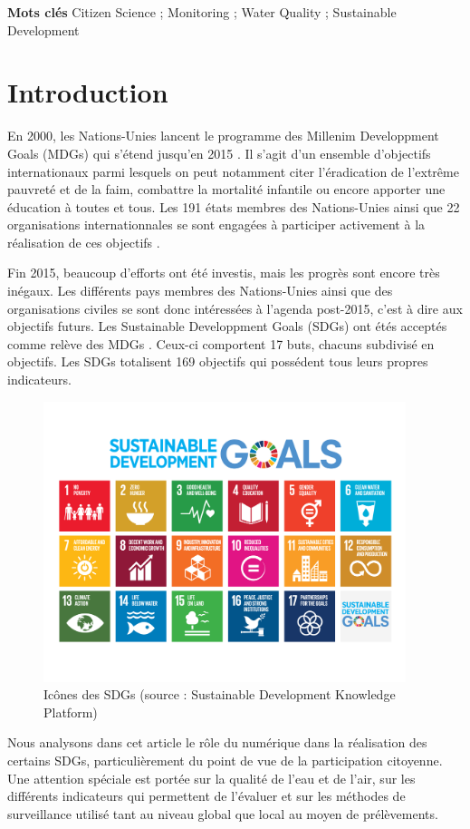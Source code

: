 \documentclass[10pt, article]{llncs}
\begin{document}
\textbf{Mots clés} Citizen Science ; Monitoring ; Water Quality ; Sustainable Development

\pagebreak

\section{Introduction}
	En 2000, les Nations-Unies lancent le programme des Millenim Developpment Goals (MDGs) qui s'étend jusqu'en 2015 \cite{united_nations_millennium_2009}. Il s'agit d'un ensemble d'objectifs internationaux parmi lesquels on peut notamment citer l'éradication de l'extrême pauvreté et de la faim, combattre la mortalité infantile ou encore apporter une éducation à toutes et tous. Les 191 états membres des Nations-Unies ainsi que 22 organisations internationnales se sont engagées à participer activement à la réalisation de ces objectifs \cite{wikipedia_millennium_2017}.
	
	Fin 2015, beaucoup d'efforts ont été investis, mais les progrès sont encore très inégaux. Les différents pays membres des Nations-Unies ainsi que des organisations civiles se sont donc intéressées à l'agenda post-2015, c'est à dire aux objectifs futurs. Les Sustainable Developpment Goals (SDGs) ont étés acceptés comme relève des MDGs \cite{wikipedia_sustainable_2017}. Ceux-ci comportent 17 buts, chacuns subdivisé en objectifs. Les SDGs totalisent 169 objectifs qui possédent tous leurs propres indicateurs.
	\begin{figure}
		\begin{center}
			\includegraphics[width=300pt]{img/sdgs.png}
		\end{center}
		\caption{Icônes des SDGs (source : Sustainable Development Knowledge Platform)}
	\end{figure}
	Nous analysons dans cet article le rôle du numérique dans la réalisation des certains SDGs, particulièrement du point de vue de la participation citoyenne. Une attention spéciale est portée sur la qualité de l'eau et de l'air, sur les différents indicateurs qui permettent de l'évaluer et sur les méthodes de surveillance utilisé tant au niveau global que local au moyen de prélèvements.
\end{document}

